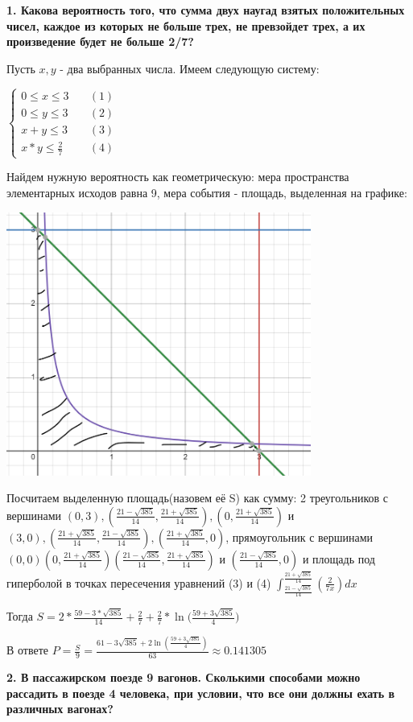 \documentclass{article}
\newcommand\xp{\frac{21+\sqrt{385}}{14}}
\newcommand\xn{\frac{21-\sqrt{385}}{14}}
\begin{document}
\textbf{1. Какова вероятность того, что сумма двух наугад взятых положительных чисел, каждое из которых не больше трех, не превзойдет трех, а их произведение будет не больше 2/7?}

Пусть $x, y$ - два выбранных числа. Имеем следующую систему:

$\begin{cases}
    0 \leq x \leq 3 & \quad (1) \\
    0 \leq y \leq 3 & \quad(2)\\
    x + y \leq 3 & \quad(3)\\
    x * y \leq \frac{2}{7} & \quad (4)
\end{cases}$

Найдем нужную вероятность как геометрическую: мера пространства элементарных исходов равна 9, мера события - площадь, выделенная на графике:

\includegraphics[width=100mm]{graph}

Посчитаем выделенную площадь(назовем её S) как сумму: 2 треугольников с вершинами $(0,3),(\xn,\xp),(0,\xp)$ и $(3,0),(\xp,\xn),(\xp,0)$, прямоугольник с вершинами $(0,0)(0,\xp)(\xn,\xp) \text{ и }(\xn,0)$ и площадь под гиперболой в точках пересечения уравнений (3) и (4) $\int^{\xp}_{\xn}(\frac{2}{7x})dx$

Тогда $S = 2 * \frac{59-3*\sqrt{385}}{14} + \frac{2}{7} + \frac{2}{7} * \ln({\frac{59+3\sqrt{385}}{4})}$

В ответе $P = \frac{S}{9} = \frac{61 - 3\sqrt{385} + 2\ln({\frac{59 + 3\sqrt{385}}{4}})}{63} \approx 0.141305$

\textbf{2. В пассажирском поезде 9 вагонов. Сколькими способами можно рассадить в поезде 4 человека, при условии, что все они должны ехать в различных вагонах?}
\end{document}

